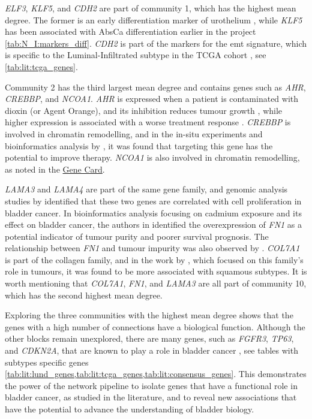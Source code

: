 \textit{ELF3}, \textit{KLF5}, and \textit{CDH2} are part of community 1, which has the highest mean degree. The former is an early differentiation marker of urothelium \citep{Bock2014-zy}, while \textit{KLF5} has been associated with AbsCa differentiation earlier in the project \cref{tab:N_I:markers_diff}. \textit{CDH2} is part of the markers for the \acrfull{emt} signature, which is specific to the Luminal-Infiltrated subtype in the TCGA cohort \citep{Robertson2017-mg}, see \cref{tab:lit:tcga_genes}.

Community 2 has the third largest mean degree and contains genes such as \textit{AHR}, \textit{CREBBP}, and \textit{NCOA1}. \textit{AHR} is expressed when a patient is contaminated with dioxin (or Agent Orange), and its inhibition reduces tumour growth \citep{d}, while higher expression is associated with a worse treatment response \citep{Ma2023-uu}. \textit{CREBBP} is involved in chromatin remodelling, and in the in-situ experiments and bioinformatics analysis by \citep{Duex2018-qg}, it was found that targeting this gene has the potential to improve therapy. \textit{NCOA1} is also involved in chromatin remodelling, as noted in the \href{https://www.uniprot.org/uniprotkb/Q15788/entry#function}{Gene Card}.

\textit{LAMA3} and \textit{LAMA4} are part of the same gene family, and genomic analysis studies by \citep{Ma2024-xc} identified that these two genes are correlated with cell proliferation in bladder cancer. In bioinformatics analysis focusing on cadmium exposure and its effect on bladder cancer, the authors in \citep{Zhang2023-ul} identified the overexpression of \textit{FN1} as a potential indicator of tumour purity and poorer survival prognosis. The relationship between \textit{FN1} and tumour impurity was also observed by \citep{Zhang2023-kv}. \textit{COL7A1} is part of the collagen family, and in the work by \citep{Guo2023-sf}, which focused on this family's role in tumours, it was found to be more associated with squamous subtypes. It is worth mentioning that \textit{COL7A1}, \textit{FN1}, and \textit{LAMA3} are all part of community 10, which has the second highest mean degree.


Exploring the three communities with the highest mean degree shows that the genes with a high number of connections have a biological function. Although the other blocks remain unexplored, there are many genes, such as \textit{FGFR3}, \textit{TP63}, and \textit{CDKN2A}, that are known to play a role in bladder cancer \cite{Robertson2017-mg,Kamoun2020-tj,Marzouka2018-ge}, see tables with subtypes specific genes \cref{tab:lit:lund_genes,tab:lit:tcga_genes,tab:lit:consensus_genes}. This demonstrates the power of the network pipeline to isolate genes that have a functional role in bladder cancer, as studied in the literature, and to reveal new associations that have the potential to advance the understanding of bladder biology.

